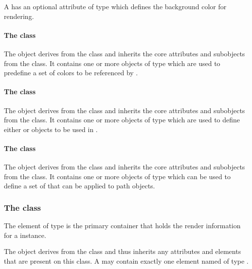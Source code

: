A \RenderInformationBase has an optional attribute
 of type  which defines the background 
color for rendering.

\paragraph{The  class}
\label{listofcolordefinitions-class}

The \ListOfColorDefinitions object derives from the  class and
inherits the core attributes and subobjects from the 
class. It contains one or more objects of type \ColorDefinition which are used to predefine a set of colors to be referenced by \Styles. 

\paragraph{The  class}
\label{listofgradientdefinitions-class}

The \ListOfGradientDefinitions object derives from the  class
and inherits the core attributes and subobjects from the 
class. It contains one or more objects of type \GradientBase which are used to define either \LinearGradient or \RadialGradient objects to be used in \Styles. 

\paragraph{The  class}
\label{listoflineendings-class}

The \ListOfLineEndings object derives from the  class and
inherits the core attributes and subobjects from the 
class. It contains one or more objects of type \LineEnding which can be used to define a set of \LineEndings that can be applied to path objects.


\subsubsection{The  class}
\label{localrenderinformation-class}
The \RenderInformation element of type \LocalRenderInformation is the primary 
container that holds the render information for a  instance. 


The \LocalRenderInformation object derives from the
\RenderInformationBase class and thus inherits any attributes and
elements that are present on this class.
A \LocalRenderInformation may contain exactly one element named  
of type \ListOfLocalStyles.

